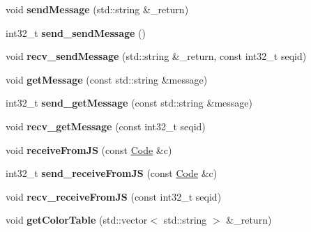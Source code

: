 \begin{DoxyCompactItemize}
void {\bfseries send\+Message} (std\+::string \&\+\_\+return)
\item 
\mbox{\label{classMARS_1_1MARSConcurrentClient_a7dca0094b73698f263fb6f6201e5520b}} 
int32\+\_\+t {\bfseries send\+\_\+send\+Message} ()
\item 
\mbox{\label{classMARS_1_1MARSConcurrentClient_a29d26ae66c87a412666bb37366adfd80}} 
void {\bfseries recv\+\_\+send\+Message} (std\+::string \&\+\_\+return, const int32\+\_\+t seqid)
\item 
\mbox{\label{classMARS_1_1MARSConcurrentClient_a512bea2e51a5af96d0400de8212f5e78}} 
void {\bfseries get\+Message} (const std\+::string \&message)
\item 
\mbox{\label{classMARS_1_1MARSConcurrentClient_a5df674de5c9b907d883ca6c83c9f362a}} 
int32\+\_\+t {\bfseries send\+\_\+get\+Message} (const std\+::string \&message)
\item 
\mbox{\label{classMARS_1_1MARSConcurrentClient_a6864176227e2850d6f8b1e4e744cda72}} 
void {\bfseries recv\+\_\+get\+Message} (const int32\+\_\+t seqid)
\item 
\mbox{\label{classMARS_1_1MARSConcurrentClient_af1b867b5428d8b73b12b579ef92b1abe}} 
void {\bfseries receive\+From\+JS} (const \hyperlink{classMARS_1_1Code}{Code} \&c)
\item 
\mbox{\label{classMARS_1_1MARSConcurrentClient_a1c4f8d29e9b16f96961232ad5d190e95}} 
int32\+\_\+t {\bfseries send\+\_\+receive\+From\+JS} (const \hyperlink{classMARS_1_1Code}{Code} \&c)
\item 
\mbox{\label{classMARS_1_1MARSConcurrentClient_ac03c1465036104325f70dd7b90b7d65e}} 
void {\bfseries recv\+\_\+receive\+From\+JS} (const int32\+\_\+t seqid)
\item 
\mbox{\label{classMARS_1_1MARSConcurrentClient_a6e1a523f7b3f7a86fc6c7e441072f7ef}} 
void {\bfseries get\+Color\+Table} (std\+::vector$<$ std\+::string $>$ \&\+\_\+return)

\end{DoxyCompactItemize}
